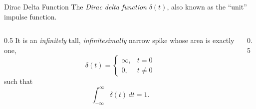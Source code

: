 \documentclass[12pt, aspectratio=169]{beamer}
\begin{document}

\begin{frame}{Dirac Delta Function}
    The \emph{Dirac delta function} $\delta(t)$, also known as the ``unit'' impulse function.
    \vspace{1em}
    \begin{columns}
        \begin{column}{0.5\textwidth}
                It is an \emph{infinitely} tall, \emph{infinitesimally} narrow spike whose area is exactly one,
            \[
                \delta(t) =
                \begin{cases}
                    \infty, & t = 0 \\
                    0,      & t \neq 0
                \end{cases}
            \]
            such that
                \[
                    \int_{-\infty}^{\infty}\!\! \delta(t)\,dt = 1.
                \]
        \end{column}
        \begin{column}{0.5\textwidth}
            
        \end{column}
    \end{columns}
    \vspace{1em}
\end{frame}

\end{document}
